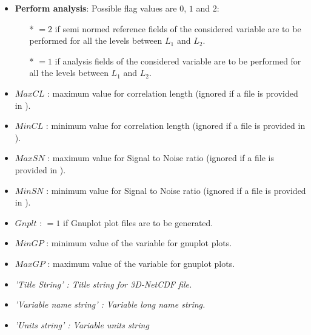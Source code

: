 {\begin{itemize}
\begin{itemize}
                \item[*] $=10$ if correlation length parameters are to be estimated using data mean distance as a minimum,
                \item[*] $=-10$ if correlation length parameters are to be estimated using data mean distance as a minimum and vertically filtered,
                \item[*] $=30$ if both  correlation length and  signal to noise ratio parameters are to be estimated using data mean distance as a minimum (for $CL$),
                \item[*] $=-30$ if both  correlation length and  signal to noise ratio parameters are to be estimated using data mean distance as a minimum (for $CL$), and both parameters vertically filtered.
              \end{itemize}

\item {\bf Perform analysis}: Possible flag values are $0$, $1$ and $2$:
              \begin{itemize}
                \item[*] $=2$ if semi normed reference fields of the considered variable are to be performed for all the levels between $L_1$ and $L_2$.
                \item[*] $=1$ if analysis fields of the considered variable are to be performed for all the levels between $L_1$ and $L_2$.
              \end{itemize}
\item $MaxCL$ : maximum value for correlation length (ignored if a  file is provided in ).
\item $MinCL$ : minimum value for correlation length  (ignored if a  file is provided in ).
\item $MaxSN$ : maximum value for Signal to Noise ratio (ignored if a  file is provided in ).
\item $MinSN$ : minimum value for Signal to Noise ratio (ignored if a  file is provided in ).
\item $Gnplt$ : $=1$ if Gnuplot plot files are to be generated.
\item $MinGP$ : minimum value of the variable for gnuplot plots.
\item $MaxGP$ : maximum value of the variable for gnuplot plots.
\item \it{'Title String'} : Title string for 3D-NetCDF file.
\item \it{'Variable name string'} : Variable long name string.
\item \it{'Units string'} : Variable units string
\end{itemize}


}
